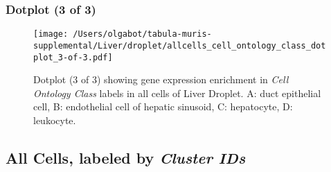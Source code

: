 \clearpage

\subsubsection{Dotplot (3 of 3)}
\begin{figure}[h]
\centering
\texttt{[image: /Users/olgabot/tabula-muris-supplemental/Liver/droplet/allcells\_cell\_ontology\_class\_dotplot\_3-of-3.pdf]}

\caption{ Dotplot (3 of 3)  showing gene expression enrichment in \emph{Cell Ontology Class} labels in all cells of Liver Droplet. A: duct epithelial cell, B: endothelial cell of hepatic sinusoid, C: hepatocyte, D: leukocyte.}
\end{figure}


\clearpage

\subsection{All Cells, labeled by \emph{Cluster IDs}}
